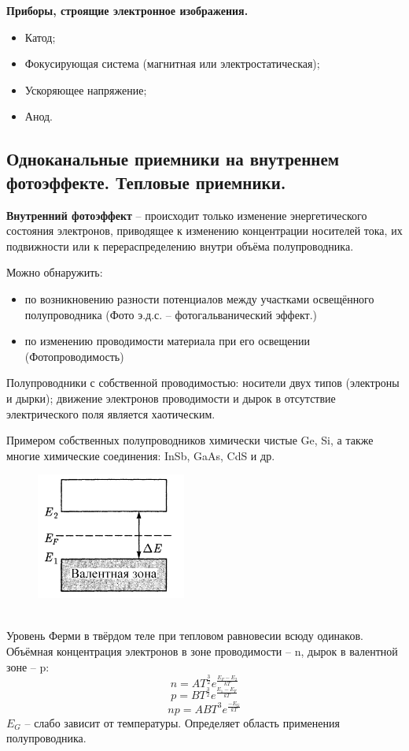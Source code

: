 \documentclass[12pt]{article}
\begin{document}
\textbf{Приборы, строящие электронное
изображения.}
\begin{itemize}
	\item Катод;
	\item Фокусирующая система (магнитная или электростатическая);
	\item Ускоряющее напряжение;
	\item Анод.
\end{itemize}

\subsection{Одноканальные приемники на внутреннем фотоэффекте. Тепловые приемники.}
\textbf{Внутренний фотоэффект} -- происходит только изменение
энергетического состояния электронов, приводящее к
изменению концентрации носителей тока, их подвижности
или к перераспределению внутри объёма полупроводника.

Можно обнаружить:
\begin{itemize}
	\item  по возникновению разности потенциалов между участками освещённого
	полупроводника (Фото э.д.с. – фотогальванический эффект.)
	\item по изменению проводимости материала при его освещении (Фотопроводимость)
\end{itemize}

Полупроводники с собственной проводимостью: носители двух типов (электроны и дырки); движение электронов проводимости и дырок в отсутствие электрического поля является хаотическим.

Примером собственных полупроводников химически чистые Ge, Si, а также
многие химические соединения: InSb, GaAs, CdS и др.\\
\begin{figure}[h]
	\centering
	\includegraphics[width=0.3\linewidth]{"Снимок экрана от 2024-12-23 19-12-32"}
\end{figure}\\
Уровень Ферми в твёрдом теле при тепловом равновесии
всюду одинаков.
Объёмная концентрация электронов в зоне проводимости -- n,
дырок в валентной зоне -- p:
$$n = AT^{\frac{3}{2}}e^{\frac{E_F-E_2}{kT}}$$
$$p = BT^{\frac{3}{2}}e^{\frac{E_1-E_F}{kT}}$$
$$np = ABT^{3}e^{\frac{-E_G}{kT}}$$
$E_G$ -- слабо зависит от температуры. Определяет область применения полупроводника.
\end{document}
